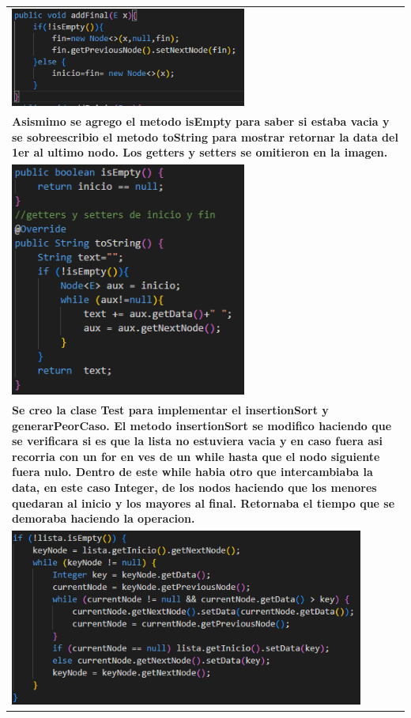 \documentclass[9pt]{article}
\begin{document}
\begin{longtable}{|p{15cm}|}
		\includegraphics[width=0.6\textwidth,keepaspectratio]{img/addFinal.png}\\
		\textbf{Asismimo se agrego el metodo isEmpty para saber si estaba vacia 
			y se sobreescribio el metodo toString para mostrar retornar la data 
			del 1er al ultimo nodo. Los getters y setters se omitieron en la imagen.}\\
		\includegraphics[width=0.6\textwidth,keepaspectratio]{img/otros.png}\\
		\textbf{Se creo la clase Test  para implementar el insertionSort y generarPeorCaso.
			El metodo insertionSort se modifico haciendo que se verificara si es que 
			la lista no estuviera vacia y en caso fuera asi recorria con un 
			for en ves de un while hasta que el nodo siguiente fuera nulo. Dentro de este while
			habia otro que intercambiaba la data, en este caso Integer, de los nodos
			haciendo que los menores quedaran al inicio y los mayores al final. Retornaba
			el tiempo que se demoraba haciendo la operacion.}\\
		\includegraphics[width=0.9\textwidth,keepaspectratio]{img/insertionSort.png}\\

\end{longtable}
\end{document}
